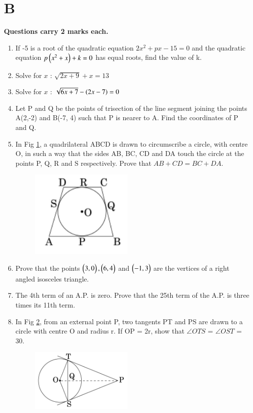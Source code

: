 \documentclass[book,11pt]{IEEEtran}
\renewcommand\thesection{\arabic{section}}
\begin{document}
\section{\textbf{B}}
\textbf{Questions carry 2 marks each.}
\begin{enumerate}[label=\thesection.\arabic*.,ref=\thesection.\theenumi]
\item If -5 is a root of the quadratic equation $2x^2+px-15=0$ and the quadratic equation $p\left(x^2+x\right)+k=0 $ has equal roots, find the value of k. \\
\item Solve for $x$ : $\sqrt{2x+9} + x = 13$ \\
\item Solve for $x$ : $\sqrt{6x+7}-\left(2x-7\right)= 0$ \\
\item  Let P and Q be the points of trisection of the line segment joining the points A(2,-2) and B(-7, 4) such that P is nearer to A. Find the coordinates of P and Q.\\
\item  In Fig \ref{figure_2}, a quadrilateral ABCD is drawn to circumscribe a circle, with centre O, in such a way that the sides AB, BC, CD and DA touch the circle at the points P, Q, R and S respectively. Prove that $ AB + CD= BC + DA $.\\
	\begin{figure}[h!]
\centering
      \includegraphics[width=5cm]{figs/2.png}
      \caption{}
      \label{figure_2}
\end{figure} 
\item  Prove that the points $\begin{pmatrix}3,0\end{pmatrix}, \begin{pmatrix}6, 4\end{pmatrix}$ and $\begin{pmatrix}-1, 3\end{pmatrix}$ are the vertices of a right angled isosceles triangle.\\
\item  The 4th term of an A.P. is zero. Prove that the 25th term of the A.P. is three times its 11th term.\\
\item  In Fig \ref{figure_3}, from an external point P, two tangents PT and PS are drawn to a circle with centre O and radius r. If OP = 2r, show that $\angle OTS $ = $\angle OST $ = 30\degree.
\begin{figure}[h!]
\centering
\includegraphics[width=5cm]{figs/3.png}
\caption{}
      \label{figure_3}
   \end{figure} 
   \end{enumerate}
\end{document}
